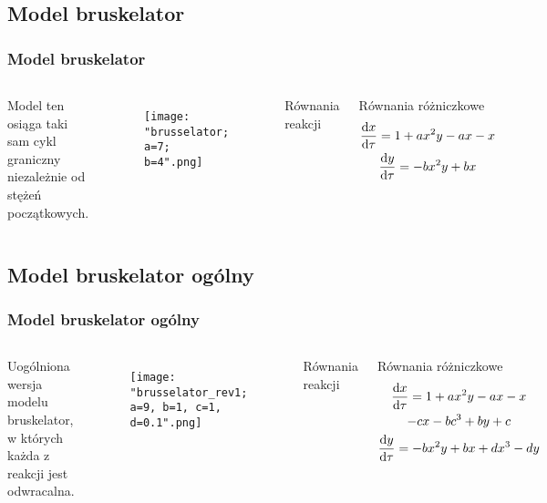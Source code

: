 \documentclass{beamer}
\begin{document}
\subsection{Model bruskelator}

\begin{frame}
\frametitle{Model bruskelator}
\begin{columns}
Model ten osiąga taki sam cykl graniczny niezależnie od stężeń początkowych. 
\begin{figure}
\texttt{[image: "brusselator; a=7; b=4".png]}
\end{figure}
\begin{block}{Równania reakcji}
\begin{center}
	 \\
	 \\
	 \\
\end{center}
\end{block}
\begin{block}{Równania różniczkowe}
\begin{gather*}
	\dv{x}{\tau} = 1+ax^{2}y-ax-x \\
	\dv{y}{\tau} = -bx^{2}y+bx
\end{gather*}
\end{block}
\end{columns}
\end{frame}

\subsection{Model bruskelator ogólny}

\begin{frame}
\frametitle{Model bruskelator ogólny}
\begin{columns}
Uogólniona wersja modelu bruskelator, w których każda z reakcji jest odwracalna. 
\begin{figure}
\texttt{[image: "brusselator\_rev1; a=9, b=1, c=1, d=0.1".png]}
\end{figure}
\begin{block}{Równania reakcji}
\begin{center}
	 \\
	 \\
	 \\
\end{center}
\end{block}
\begin{block}{Równania różniczkowe}
\begin{gather*}
	\dv{x}{\tau} = 1 + ax^{2}y - ax - x \\
	- cx - bc^{3} + by + c \\
	\dv{y}{\tau} = -bx^{2}y + bx + dx^{3} - dy
\end{gather*}
\end{block}
\end{columns}
\end{frame}
\end{document}
